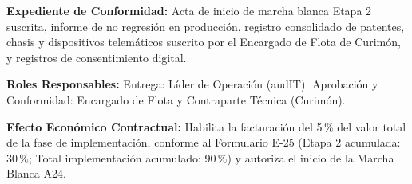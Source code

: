\par\noindent\textbf{Expediente de Conformidad:} Acta de inicio de marcha blanca Etapa 2 suscrita, informe de no regresión en producción, registro consolidado de patentes, chasis y dispositivos telemáticos suscrito por el Encargado de Flota de Curimón, y registros de consentimiento digital.\par
\par\noindent\textbf{Roles Responsables:} Entrega: Líder de Operación (audIT). Aprobación y Conformidad: Encargado de Flota y Contraparte Técnica (Curimón).\par
\par\noindent\textbf{Efecto Económico Contractual:} Habilita la facturación del 5\,\% del valor total de la fase de implementación, conforme al Formulario E-25 (Etapa 2 acumulada: 30\,\%; Total implementación acumulado: 90\,\%) y autoriza el inicio de la Marcha Blanca A24.\par

